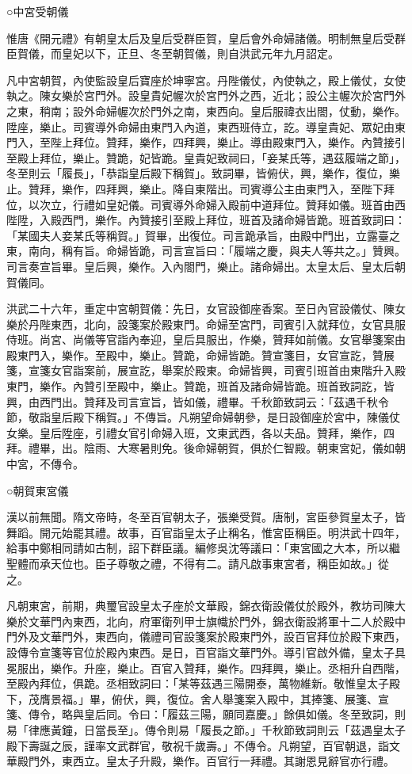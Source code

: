 ○中宮受朝儀

惟唐《開元禮》有朝皇太后及皇后受群臣賀，皇后會外命婦諸儀。明制無皇后受群臣賀儀，而皇妃以下，正旦、冬至朝賀儀，則自洪武元年九月詔定。

凡中宮朝賀，內使監設皇后寶座於坤寧宮。丹陛儀仗，內使執之，殿上儀仗，女使執之。陳女樂於宮門外。設皇貴妃幄次於宮門外之西，近北；設公主幄次於宮門外之東，稍南；設外命婦幄次於門外之南，東西向。皇后服禕衣出閤，仗動，樂作。陞座，樂止。司賓導外命婦由東門入內道，東西班侍立，訖。導皇貴妃、眾妃由東門入，至陛上拜位。贊拜，樂作，四拜興，樂止。導由殿東門入，樂作。內贊接引至殿上拜位，樂止。贊跪，妃皆跪。皇貴妃致祠曰，「妾某氏等，遇茲履端之節」，冬至則云「履長」，「恭詣皇后殿下稱賀」。致詞畢，皆俯伏，興，樂作，復位，樂止。贊拜，樂作，四拜興，樂止。降自東階出。司賓導公主由東門入，至陛下拜位，以次立，行禮如皇妃儀。司賓導外命婦入殿前中道拜位。贊拜如儀。班首由西陛陞，入殿西門，樂作。內贊接引至殿上拜位，班首及諸命婦皆跪。班首致詞曰：「某國夫人妾某氏等稱賀。」賀畢，出復位。司言跪承旨，由殿中門出，立露臺之東，南向，稱有旨。命婦皆跪，司言宣旨曰：「履端之慶，與夫人等共之。」贊興。司言奏宣旨畢。皇后興，樂作。入內閤門，樂止。諸命婦出。太皇太后、皇太后朝賀儀同。

洪武二十六年，重定中宮朝賀儀：先日，女官設御座香案。至日內官設儀仗、陳女樂於丹陛東西，北向，設箋案於殿東門。命婦至宮門，司賓引入就拜位，女官具服侍班。尚宮、尚儀等官詣內奉迎，皇后具服出，作樂，贊拜如前儀。女官舉箋案由殿東門入，樂作。至殿中，樂止。贊跪，命婦皆跪。贊宣箋目，女官宣訖，贊展箋，宣箋女官詣案前，展宣訖，舉案於殿東。命婦皆興，司賓引班首由東階升入殿東門，樂作。內贊引至殿中，樂止。贊跪，班首及諸命婦皆跪。班首致詞訖，皆興，由西門出。贊拜及司言宣旨，皆如儀，禮畢。千秋節致詞云：「茲遇千秋令節，敬詣皇后殿下稱賀。」不傳旨。凡朔望命婦朝參，是日設御座於宮中，陳儀仗女樂。皇后陞座，引禮女官引命婦入班，文東武西，各以夫品。贊拜，樂作，四拜。禮畢，出。陰雨、大寒暑則免。後命婦朝賀，俱於仁智殿。朝東宮妃，儀如朝中宮，不傳令。

○朝賀東宮儀

漢以前無聞。隋文帝時，冬至百官朝太子，張樂受賀。唐制，宮臣參賀皇太子，皆舞蹈。開元始罷其禮。故事，百官詣皇太子止稱名，惟宮臣稱臣。明洪武十四年，給事中鄭相同請如古制，詔下群臣議。編修吳沈等議曰：「東宮國之大本，所以繼聖體而承天位也。臣子尊敬之禮，不得有二。請凡啟事東宮者，稱臣如故。」從之。

凡朝東宮，前期，典璽官設皇太子座於文華殿，錦衣衛設儀仗於殿外，教坊司陳大樂於文華門內東西，北向，府軍衛列甲士旗幟於門外，錦衣衛設將軍十二人於殿中門外及文華門外，東西向，儀禮司官設箋案於殿東門外，設百官拜位於殿下東西，設傳令宣箋等官位於殿內東西。是日，百官詣文華門外。導引官啟外備，皇太子具冕服出，樂作。升座，樂止。百官入贊拜，樂作。四拜興，樂止。丞相升自西階，至殿內拜位，俱跪。丞相致詞曰：「某等茲遇三陽開泰，萬物維新。敬惟皇太子殿下，茂膺景福。」畢，俯伏，興，復位。舍人舉箋案入殿中，其捧箋、展箋、宣箋、傳令，略與皇后同。令曰：「履茲三陽，願同嘉慶。」餘俱如儀。冬至致詞，則易「律應黃鐘，日當長至」。傳令則易「履長之節。」千秋節致詞則云「茲遇皇太子殿下壽誕之辰，謹率文武群官，敬祝千歲壽。」不傳令。凡朔望，百官朝退，詣文華殿門外，東西立。皇太子升殿，樂作。百官行一拜禮。其謝恩見辭官亦行禮。

